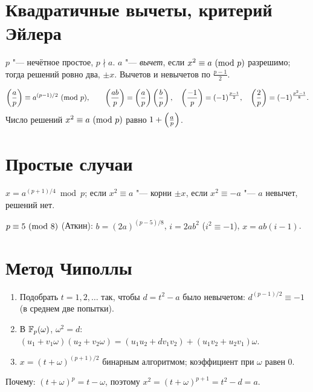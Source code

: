 \documentclass{ca-handout}
\begin{document}
\makehandouttitle

\section{Квадратичные вычеты, критерий Эйлера}
$p$ "--- нечётное простое, $p \nmid a$. $a$ "--- \emph{вычет}, если $x^2 \equiv a \ (\mathrm{mod}\ p)$ разрешимо;
тогда решений ровно два, $\pm x$. Вычетов и невычетов по $\frac{p-1}{2}$.
\begin{reminder}[title={Критерий Эйлера и символ Лежандра}]
\[
  \left(\frac{a}{p}\right) \equiv a^{(p-1)/2} \ (\mathrm{mod}\ p), \qquad
  \left(\frac{ab}{p}\right) = \left(\frac{a}{p}\right)\left(\frac{b}{p}\right), \quad
  \left(\frac{-1}{p}\right) = (-1)^{\frac{p-1}{2}}, \quad \left(\frac{2}{p}\right) = (-1)^{\frac{p^2-1}{8}}.
\]
Число решений $x^2 \equiv a \ (\mathrm{mod}\ p)$ равно $1 + \left(\frac{a}{p}\right)$.
\end{reminder}

\section{Простые случаи}
\begin{reminder}[title={$p \equiv 3 \pmod 4$}]
$x = a^{(p+1)/4} \bmod p$; если $x^2 \equiv a$ "--- корни $\pm x$, если $x^2 \equiv -a$ "---
$a$ невычет, решений нет.
\end{reminder}
$p \equiv 5 \ (\mathrm{mod}\ 8)$ (Аткин): $b = (2a)^{(p-5)/8}$, $i = 2ab^2$ ($i^2 \equiv -1$), $x = ab(i - 1)$.

\section{Метод Чиполлы}
\begin{reminder}[title={$x^2 \equiv a \pmod p$, $\legendre{a}{p} = 1$}]
\begin{enumerate}
  \item Подобрать $t = 1, 2, \dots$ так, чтобы $d = t^2 - a$ было невычетом:
    $d^{(p-1)/2} \equiv -1$ (в среднем две попытки).
  \item В $\mathbb{F}_{p}(\omega)$, $\omega^2 = d$:\quad
    $(u_1 + v_1\omega)(u_2 + v_2\omega) = (u_1u_2 + d v_1v_2) + (u_1v_2 + u_2v_1)\omega$.
  \item $x = (t + \omega)^{(p+1)/2}$ бинарным алгоритмом; коэффициент при $\omega$ равен $0$.
\end{enumerate}
Почему: $(t + \omega)^p = t - \omega$, поэтому $x^2 = (t + \omega)^{p+1} = t^2 - d = a$.
\end{reminder}
\end{document}
